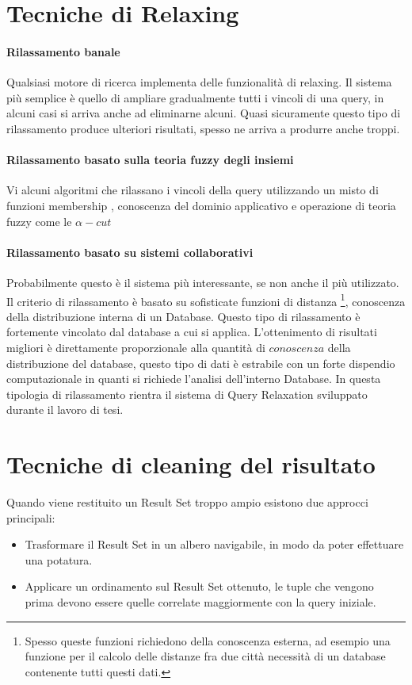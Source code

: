 \section{Tecniche di Relaxing}
\paragraph{Rilassamento banale}
Qualsiasi motore di ricerca implementa delle funzionalità di relaxing.
Il sistema più semplice è quello di ampliare gradualmente tutti i vincoli di una query, in alcuni casi si arriva anche ad eliminarne alcuni.
Quasi sicuramente questo tipo  di rilassamento produce ulteriori risultati, spesso ne arriva a produrre anche troppi.
\paragraph{Rilassamento basato sulla teoria fuzzy degli insiemi}
Vi alcuni algoritmi \cite{generalfuzzy} \cite{emptyvs} che rilassano i vincoli della query utilizzando un misto di funzioni membership , conoscenza del dominio applicativo e operazione di teoria fuzzy come le $\alpha-cut$
\paragraph{Rilassamento basato su sistemi collaborativi}
Probabilmente questo è il sistema più interessante, se non anche il più utilizzato. Il criterio di rilassamento è basato su sofisticate funzioni di distanza \footnote{Spesso queste funzioni richiedono della conoscenza esterna, ad esempio una funzione per il calcolo delle distanze fra due città necessità di un database contenente tutti questi dati.}, conoscenza della distribuzione interna di un Database. 
Questo tipo di rilassamento è fortemente vincolato dal database a cui si applica. L'ottenimento di risultati migliori è direttamente proporzionale alla quantità di $conoscenza$ della distribuzione del database, questo tipo di dati è estrabile con un forte dispendio computazionale in quanti si richiede l'analisi dell'interno Database.  In questa tipologia di rilassamento rientra il sistema di Query Relaxation sviluppato durante il lavoro di tesi.

\section{Tecniche di cleaning del risultato}
Quando viene restituito un Result Set troppo ampio esistono due approcci principali:
\begin{itemize}
\item Trasformare il Result Set in un albero navigabile, in modo da poter effettuare una potatura.
\item Applicare un ordinamento sul Result Set ottenuto, le tuple che vengono prima devono essere quelle correlate maggiormente con la query iniziale.
\end{itemize}

